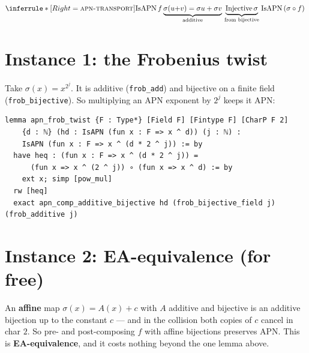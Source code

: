 \documentclass[11pt]{article}
\begin{document}
\[
\inferrule*[Right=\textsc{apn-transport}]
{
  \mathrm{IsAPN}\,f
  \\
  \underbrace{\sigma(u{+}v)=\sigma u+\sigma v}_{\text{additive}}
  \\
  \underbrace{\mathrm{Injective}\,\sigma}_{\text{from bijective}}
}
{\;\mathrm{IsAPN}\,(\sigma\circ f)\;}
\]


\bigskip

\section{Instance 1: the Frobenius twist}

\noindent
Take $\sigma(x)=x^{2^j}$. It is additive (\texttt{frob\_add}) and bijective on a
finite field (\texttt{frob\_bijective}). So multiplying an APN exponent by $2^j$
keeps it APN:

\begin{lstlisting}
lemma apn_frob_twist {F : Type*} [Field F] [Fintype F] [CharP F 2]
    {d : ℕ} (hd : IsAPN (fun x : F => x ^ d)) (j : ℕ) :
    IsAPN (fun x : F => x ^ (d * 2 ^ j)) := by
  have heq : (fun x : F => x ^ (d * 2 ^ j)) =
      (fun x => x ^ (2 ^ j)) ∘ (fun x => x ^ d) := by
    ext x; simp [pow_mul]
  rw [heq]
  exact apn_comp_additive_bijective hd (frob_bijective_field j) (frob_additive j)
\end{lstlisting}


\bigskip

\section{Instance 2: EA-equivalence (for free)}

\noindent
An \textbf{affine} map $\sigma(x)=A(x)+c$ with $A$ additive and bijective is an
additive bijection up to the constant $c$ --- and in the collision both copies of
$c$ cancel in char $2$. So pre- and post-composing $f$ with affine bijections
preserves APN. This is \textbf{EA-equivalence}, and it costs nothing beyond the
one lemma above.
\end{document}

